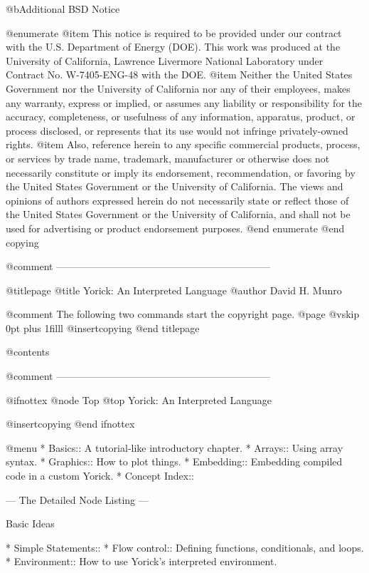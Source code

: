@b{Additional BSD Notice}

@enumerate
@item
This notice is required to be provided under our contract with the
U.S. Department of Energy (DOE). This work was produced at the
University of California, Lawrence Livermore National Laboratory under
Contract No. W-7405-ENG-48 with the DOE.
@item
Neither the United States Government nor the University of
California nor any of their employees, makes any warranty, express or
implied, or assumes any liability or responsibility for the accuracy,
completeness, or usefulness of any information, apparatus, product, or
process disclosed, or represents that its use would not infringe
privately-owned rights.
@item
Also, reference herein to any specific commercial products,
process, or services by trade name, trademark, manufacturer or
otherwise does not necessarily constitute or imply its endorsement,
recommendation, or favoring by the United States Government or the
University of California. The views and opinions of authors expressed
herein do not necessarily state or reflect those of the United States
Government or the University of California, and shall not be used for
advertising or product endorsement purposes.
@end enumerate
@end copying

@comment -----------------------------------------------------------------

@titlepage
@title Yorick: An Interpreted Language
@author David H. Munro

@comment  The following two commands start the copyright page.
@page
@vskip 0pt plus 1filll
@insertcopying
@end titlepage

@contents

@comment -----------------------------------------------------------------

@ifnottex
@node Top
@top Yorick: An Interpreted Language

@insertcopying
@end ifnottex

@menu
* Basics::                      A tutorial-like introductory chapter.
* Arrays::                      Using array syntax.
* Graphics::                    How to plot things.
* Embedding::                   Embedding compiled code in a custom Yorick.
* Concept Index::               

 --- The Detailed Node Listing ---

Basic Ideas

* Simple Statements::           
* Flow control::                Defining functions, conditionals, and loops.
* Environment::                 How to use Yorick's interpreted environment.

